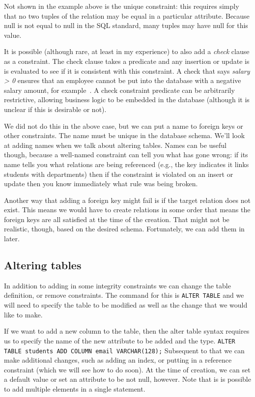 \documentclass[a4paper]{report}
\begin{document}
Not shown in the example above is the unique constraint: this requires simply that no two tuples of the relation may be equal in a particular attribute. Because null is not equal to null in the SQL standard, many tuples may have null for this value.

It is possible (although rare, at least in my experience) to also add a \textit{check} clause as a constraint. The check clause takes a predicate and any insertion or update is is evaluated to see if it is consistent with this constraint. A check that says \textit{salary > 0} ensures that an employee cannot be put into the database with a negative salary amount, for example~\cite{dsc}. A check constraint predicate can be arbitrarily restrictive, allowing business logic to be embedded in the database (although it is unclear if this is desirable or not).

We did not do this in the above case, but we can put a name to foreign keys or other constraints. The name must be unique in the database schema. We'll look at adding names when we talk about altering tables. Names can be useful though, because a well-named constraint can tell you what has gone wrong: if its name tells you what relations are being referenced (e.g., the key indicates it links students with departments) then if the constraint is violated on an insert or update then you know immediately what rule was being broken.

Another way that adding a foreign key might fail is if the target relation does not exist. This means we would have to create relations in some order that means the foreign keys are all satisfied at the time of the creation. That might not be realistic, though, based on the desired schema. Fortunately, we can add them in later.

\subsection*{Altering tables}

In addition to adding in some integrity constraints we can change the table definition, or remove constraints. The command for this is \texttt{ALTER TABLE} and we will need to specify the table to be modified as well as the change that we would like to make. 

If we want to add a new column to the table, then the alter table syntax requires us to specify the name of the new attribute to be added and the type. \texttt{ALTER TABLE students ADD COLUMN email VARCHAR(128);} Subsequent to that we can make additional changes, such as adding an index, or putting in a reference constraint (which we will see how to do soon). At the time of creation, we can set a default value or set an attribute to be not null, however. Note that is is possible to add multiple elements in a single statement. 
\end{document}
